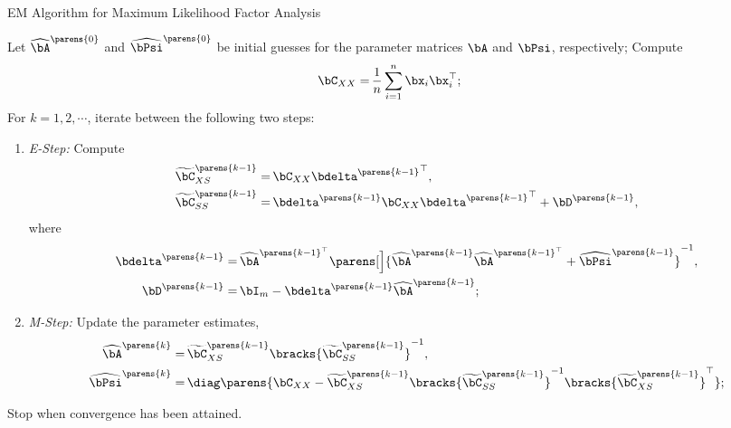\documentclass[12pt]{article}
\begin{document}
\begin{enumerate}[label=\textbf{\arabic*.}]
	\begin{minipage}{\linewidth}
		\begin{algorithm}[H]
		\caption{EM Algorithm for Maximum Likelihood Factor Analysis}\label{algo-ml-fa}
		\begin{algorithmic}[1]
			\STATE Let $\widehat{\bA}^{\parens{0}}$ and $\widehat{\bPsi}^{\parens{0}}$ be initial guesses for the parameter matrices $\bA$ and $\bPsi$, respectively; 
			\STATE Compute 
			\begin{align*}
				\bC_{XX} = & \, \frac{1}{n} \sum_{i=1}^n \bx_i \bx_i^\top; 
			\end{align*}
			\STATE For $k = 1, 2, \cdots$, iterate between the following two steps: 
			\begin{enumerate}
				\item \textit{E-Step:} Compute 
				\begin{align*}
					\widetilde{\bC}_{XS}^{\parens{k-1}} = & \, \bC_{XX} {\bdelta^{\parens{k-1}}}^\top, \\
					\widetilde{\bC}_{SS}^{\parens{k-1}} = & \, \bdelta^{\parens{k-1}} \bC_{XX} {\bdelta^{\parens{k-1}}}^\top + \bD^{\parens{k-1}}, 
				\end{align*}
				where 
				\begin{align*}
					\bdelta^{\parens{k-1}} = & \, \widehat{\bA}^{\parens{k-1}^\top}\parens[\Big]{\widehat{\bA}^{\parens{k-1}} \widehat{\bA}^{\parens{k-1}^\top} + \widehat{\bPsi}^{\parens{k-1}}}^{-1}, \\ 
					\bD^{\parens{k-1}} = & \, \bI_m - \bdelta^{\parens{k-1}} \widehat{\bA}^{\parens{k-1}}; 
				\end{align*}
				
				\item \textit{M-Step:} Update the parameter estimates, 
				\begin{align*}
					\widehat{\bA}^{\parens{k}} = & \, \widetilde{\bC}_{XS}^{\parens{k-1}} \bracks{\widetilde{\bC}_{SS}^{\parens{k-1}}}^{-1}, \\ 
					\widehat{\bPsi}^{\parens{k}} = & \, \diag \parens{ \bC_{XX} - \widetilde{\bC}_{XS}^{\parens{k-1}} \bracks{\widetilde{\bC}_{SS}^{\parens{k-1}}}^{-1} \bracks{\widetilde{\bC}_{XS}^{\parens{k-1}}}^\top 
					}; 
				\end{align*}
				\end{enumerate}
			\STATE Stop when convergence has been attained. 
		\end{algorithmic}
		\end{algorithm}
	\end{minipage}
	

\end{enumerate}
\end{document}
